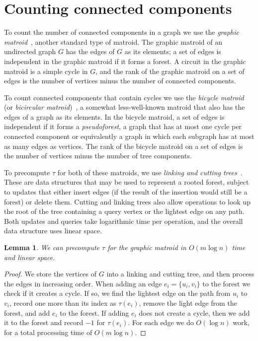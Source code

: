 \documentclass[11pt]{article}
\newtheorem{lemma}{Lemma}
\begin{document}
\section{Counting connected components}
To count the number of connected components in a graph we use the \emph{graphic matroid}~\cite{Welsh10}, another standard type of matroid. The graphic matroid of an undirected graph $G$ has the edges of $G$ as its elements; a set of edges is independent in the graphic matroid if it forms a forest. A circuit in the graphic matroid is a simple cycle in $G$, and the rank of the graphic matroid on a set of edges is the number of vertices minus the number of connected components.

To count connected components that contain cycles we use the \emph{bicycle matroid} (or \emph{bicircular matroid})~\cite{Matthews77}, a somewhat less-well-known matroid that also has the edges of a graph as its elements. In the bicycle matroid, a set of edges is independent if it forms a \emph{pseudoforest}, a graph that has at most one cycle per connected component or equivalently a graph in which each subgraph has at most as many edges as vertices. The rank of the bicycle matroid on a set of edges is the number of vertices minus the number of tree components.

To precompute $\tau$ for both of these matroids, we use \emph{linking and cutting trees}~\cite{LinkCutArt, LinkCutBook}. These are data structures that may be used to represent a rooted forest, subject to updates that either insert edges (if the result of the insertion would still be a forest) or delete them. Cutting and linking trees also allow operations to look up the root of the tree containing a query vertex or the lightest edge on any path. Both updates and queries take logarithmic time per operation, and the overall data structure uses linear space.

\begin{lemma}\label{lem:connected-component}
We can precompute $\tau$ for the graphic matroid in $O(m\log n)$ time and linear space.
\end{lemma}
\begin{proof}
We store the vertices of $G$ into a linking and cutting tree, and then process the edges in increasing order. When adding an edge $e_i = \{u_i, v_i\}$ to the forest we check if it creates a cycle. If so, we find the lightest edge on the path from $u_i$ to $v_i$, record one more than its index as $\tau(e_i)$, remove the light edge from the forest, and add $e_i$ to the forest. If adding $e_i$ does not create a cycle, then we add it to the forest and record $-1$ for $\tau(e_i)$. For each edge we do $O(\log n)$ work, for a total processing time of $O(m\log n)$.
\end{proof}
\end{document}
